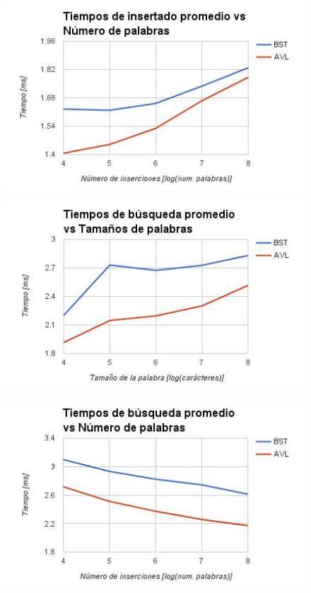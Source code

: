 \documentclass[12pt,letterpaper,hidelinks]{extarticle}
\begin{document}
	\begin{figure}[ht!]
		\centering \includegraphics[scale=0.8]{img/ins-num.jpg}
	\end{figure}

\newpage

	\begin{figure}[ht!]
		\centering \includegraphics[scale=0.8]{img/srch-size.jpg}
	\end{figure}

	\begin{figure}[ht!]
		\centering \includegraphics[scale=0.8]{img/srch-num.jpg}
	\end{figure}
\end{document}
